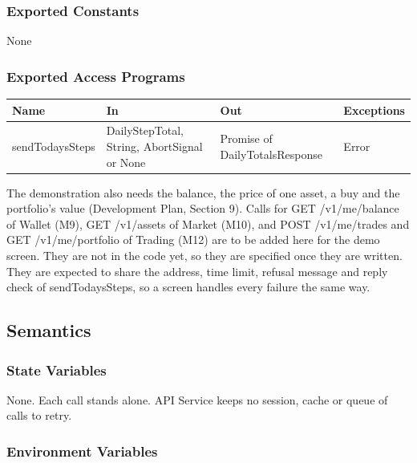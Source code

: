 \documentclass[12pt, titlepage]{article}
\begin{document}
\subsubsection{Exported Constants}

None

\subsubsection{Exported Access Programs}

\begin{center}
\small
\setlength{\tabcolsep}{3pt}
\begin{tabular}{>{\raggedright\arraybackslash}p{3.2cm}
  >{\raggedright\arraybackslash}p{4.6cm}
  >{\raggedright\arraybackslash}p{4.4cm}
  >{\raggedright\arraybackslash}p{2.6cm}}
\toprule
\textbf{Name} & \textbf{In} & \textbf{Out} & \textbf{Exceptions} \\
\midrule
sendTodaysSteps & DailyStepTotal, String, AbortSignal or None & Promise of
  DailyTotalsResponse & Error \\
\bottomrule
\end{tabular}
\end{center}

\noindent The demonstration also needs the balance, the price of one asset, a
buy and the portfolio's value (Development Plan, Section 9). Calls for
GET /v1/me/balance of Wallet (M9), GET /v1/assets of Market (M10), and
POST /v1/me/trades and GET /v1/me/portfolio of Trading (M12) are to be added
here for the demo screen. They are not in the code yet, so they are specified
once they are written. They are expected to share the address, time limit,
refusal message and reply check of sendTodaysSteps, so a screen handles every
failure the same way.

\subsection{Semantics}

\subsubsection{State Variables}

None. Each call stands alone. API Service keeps no session, cache or queue of
calls to retry.

\subsubsection{Environment Variables}
\end{document}
